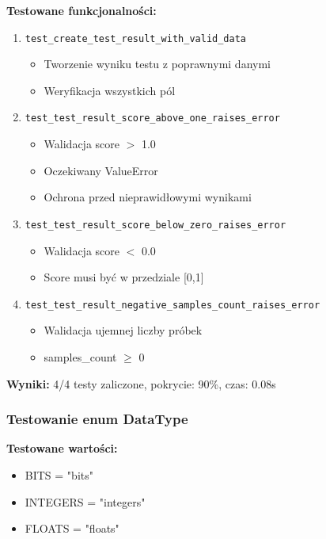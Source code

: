 \documentclass[12pt,a4paper]{article}
\begin{document}
\textbf{Testowane funkcjonalności:}
\begin{enumerate}
    \item \texttt{test\_create\_test\_result\_with\_valid\_data}
    \begin{itemize}
        \item Tworzenie wyniku testu z poprawnymi danymi
        \item Weryfikacja wszystkich pól
    \end{itemize}
    
    \item \texttt{test\_test\_result\_score\_above\_one\_raises\_error}
    \begin{itemize}
        \item Walidacja score $>$ 1.0
        \item Oczekiwany ValueError
        \item Ochrona przed nieprawidłowymi wynikami
    \end{itemize}
    
    \item \texttt{test\_test\_result\_score\_below\_zero\_raises\_error}
    \begin{itemize}
        \item Walidacja score $<$ 0.0
        \item Score musi być w przedziale [0,1]
    \end{itemize}
    
    \item \texttt{test\_test\_result\_negative\_samples\_count\_raises\_error}
    \begin{itemize}
        \item Walidacja ujemnej liczby próbek
        \item samples\_count $\geq$ 0
    \end{itemize}
\end{enumerate}

\textbf{Wyniki:} 4/4 testy zaliczone, pokrycie: 90\%, czas: 0.08s

\subsubsection{Testowanie enum DataType}

\textbf{Testowane wartości:}
\begin{itemize}
    \item BITS = "bits"
    \item INTEGERS = "integers"
    \item FLOATS = "floats"
\end{itemize}
\end{document}
